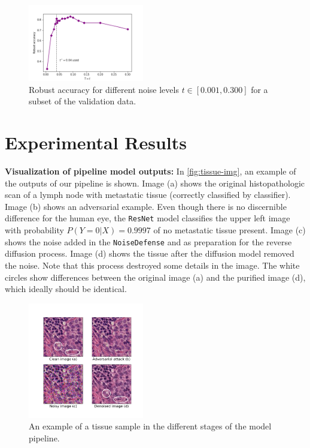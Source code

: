 \begin{figure}
    \includegraphics[width=0.45\textwidth]{Figures/noise_cv.png}
    \caption{Robust accuracy for different noise levels $t\in[0.001, 0.300]$ for a subset of the validation data.}
    \label{fig:noise-level}
\end{figure}


\section{Experimental Results}


\textbf{Visualization of pipeline model outputs:}
In \autoref{fig:tissue-img}, an example of the outputs of our pipeline is shown. Image (a) shows the original histopathologic scan of a lymph node with metastatic tissue (correctly classified by classifier). Image (b) shows an adversarial example. Even though there is no discernible difference for the human eye, the \texttt{ResNet} model classifies the upper left image with probability $P(Y=0|X)=0.9997$ of no metastatic tissue present. Image (c) shows the noise added in the \texttt{NoiseDefense} and as preparation for the reverse diffusion process. Image (d) shows the tissue after the diffusion model removed the noise. Note that this process destroyed some details in the image. The white circles show differences between the original image (a) and the purified image (d), which ideally should be identical.


\begin{figure}
    \includegraphics[width=0.45\textwidth]{Figures/images_tissue.png}
    \caption{An example of a tissue sample in the different stages of the model pipeline.}
    \label{fig:tissue-img}
\end{figure}


